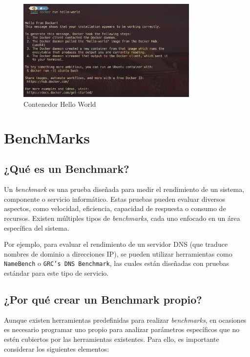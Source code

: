 \begin{figure}[H]
    \centering
    \includegraphics[width=0.8\textwidth]{images/Bloque2/hello-world.png}
    \caption{Contenedor Hello World}
    \label{fig:hello-world}
\end{figure}

\section{BenchMarks}

\subsection{¿Qué es un Benchmark?}

Un \textit{benchmark} es una prueba diseñada para medir el rendimiento de un sistema, componente o servicio informático. Estas pruebas pueden evaluar diversos aspectos, como velocidad, eficiencia, capacidad de respuesta o consumo de recursos. Existen múltiples tipos de \textit{benchmarks}, cada uno enfocado en un área específica del sistema.

Por ejemplo, para evaluar el rendimiento de un servidor DNS (que traduce nombres de dominio a direcciones IP), se pueden utilizar herramientas como \texttt{NameBench} o \texttt{GRC’s DNS Benchmark}, las cuales están diseñadas con pruebas estándar para este tipo de servicio.

\subsection{¿Por qué crear un Benchmark propio?}

Aunque existen herramientas predefinidas para realizar \textit{benchmarks}, en ocasiones es necesario programar uno propio para analizar parámetros específicos que no estén cubiertos por las herramientas existentes. Para ello, es importante considerar los siguientes elementos:

